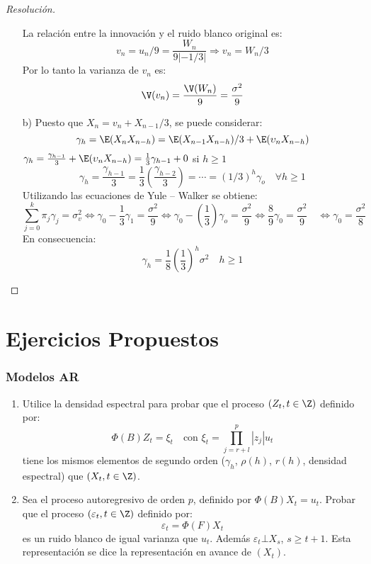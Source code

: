\begin{ejemplo}
\begin{proof}[Resoluci\'{o}n]
\begin{enumerate}
La relaci\'{o}n entre la innovaci\'{o}n y el ruido blanco original es:
\[
v_{n} =u_{n} /9=\frac{W_{n} }{9\left| {-1/3} \right|} \Longrightarrow v_{n} =W_{n} /3
\]
Por lo tanto la varianza de $v_{n}$ es:
\[
\V(v_{n} )=\frac{\V(W_{n} )}{9}=\frac{\sigma^{2}}{9}
\]

\item[b)] Puesto que $X_{n} =v_{n} +X_{n-1} /3$, se puede considerar:
\[
\gamma_{h} =\E(X_{n} X_{n-h} )=\E(X_{n-1} X_{n-h} )/3+\E(\upsilon_{n} X_{n-h} )
\]
$\gamma_{h} =\frac{\gamma_{h-1} }{3}+\E(\upsilon_{n} X_{n-h} )=\frac{1}{3}\gamma_{h-1} +0$ si $h\ge 1$
\[
\gamma_{h} =\frac{\gamma_{h-1} }{3}=\frac{1}{3}(\frac{\gamma_{h-2} }{3})=\cdots=(1/3)^{h}\gamma_{o} \quad \forall h\ge 1
\]
Utilizando las ecuaciones de Yule -- Walker se obtiene:
\[
\sum_{j=0}^k {\pi_{j} } \gamma_{j} =\sigma_{v}^{2}\Leftrightarrow \gamma_{0} -\frac{1}{3}\gamma_{1} =\frac{\sigma^{2}}{9}\Leftrightarrow \gamma_{0} -\left( {\frac{1}{3}} \right)\gamma_{o} =\frac{\sigma^{2}}{9} \Leftrightarrow \frac{8}{9}\gamma_{0} =\frac{\sigma^{2}}{9}\quad \Leftrightarrow \gamma_{0} =\frac{\sigma^{2}}{8}
\]
En consecuencia:
\[
\gamma_{h} =\frac{1}{8}\left( {\frac{1}{3}} \right)^{h}\sigma^{2} \quad h\ge 1
\]
\end{enumerate}
\end{proof}
\end{ejemplo}


\section{Ejercicios Propuestos}

\subsubsection*{Modelos AR}

\begin{enumerate}
 \item Utilice la densidad espectral para probar que el proceso $(Z_{{t}}, t\in \Z)$ definido por:
 \[
  \Phi \left( B \right)Z_{t} =\xi_{t}\quad\text{con }\xi_{t} =\prod_{j=r+l}^{p} \left| {z_{j} } \right|u_{t} 
 \]
tiene los mismos elementos de segundo orden ($\gamma_{h}$, $\rho( h)$, $r(h)$, densidad espectral) que $\left({X_{t}, t\in \Z} \right)$.

\item Sea el proceso autoregresivo de orden $p$, definido por $\Phi \left( B \right)X_{t} =u_{t} $. Probar que el proceso $(\varepsilon_t, t\in \Z)$ definido por:
\[
\varepsilon_{t} =\Phi \left( F \right)X_{t} 
\]
es un ruido blanco de igual varianza que $u_{{t}}$. Adem\'{a}s $\varepsilon_{t} \bot X_{s}$, $s\ge t+1$. Esta representaci\'{o}n se dice la representaci\'{o}n en avance de $(X_{t} )$.
\end{enumerate}


